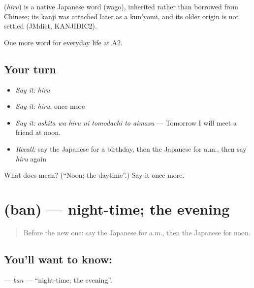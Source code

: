 \begin{cousinweb}
\textbf{} (\emph{hiru}) is a native Japanese word (wago), inherited rather than borrowed from Chinese; its kanji was attached later as a kun'yomi, and its older origin is not settled (JMdict, KANJIDIC2).
\end{cousinweb}

\begin{grammarlens}[title={What you've built}]
One more word for everyday life at A2.
\end{grammarlens}

\subsection*{Your turn}
\begin{itemize}
\raggedright
  \item \emph{Say it:} \emph{hiru}
  \item \emph{Say it:} \emph{hiru}, once more
  \item \emph{Say it:} \emph{ashita wa hiru ni tomodachi to aimasu} — Tomorrow I will meet a friend at noon.
  \item \emph{Recall:} say the Japanese for a birthday, then the Japanese for a.m., then say \emph{hiru} again
\end{itemize}

\begin{tcolorbox}[breakable,colback=teal!4,colframe=teal!35!black,title={Before you move on}]
What does  mean? (\textquotedblleft{}Noon; the daytime\textquotedblright{}.) Say it once more.
\end{tcolorbox}
\section[\texorpdfstring{\ja{ばん} (ban)}{ばん (ban)}]{ (ban) — night-time; the evening}

\label{lesson:JA-C166-ban}



\begin{quote}
Before the new one: say the Japanese for a.m., then the Japanese for noon.
\end{quote}

\subsection*{You'll want to know: }
\textbf{} — \emph{ban} — \textquotedblleft{}night-time; the evening\textquotedblright{}.

